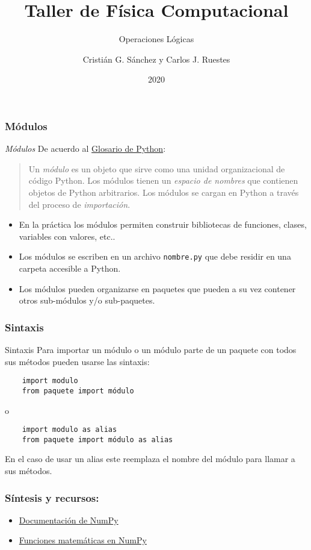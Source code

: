 \documentclass{beamer}
\title{Taller de Física Computacional}
\subtitle{Operaciones Lógicas}
\author{Cristián G. Sánchez y Carlos J. Ruestes}
\date{2020}
\begin{document}
\frame{\titlepage}

\begin{frame}[fragile]
    \frametitle{Módulos}
    \begin{block}{{\em Módulos}}
    De acuerdo al \href{https://docs.python.org/3/glossary.html}{Glosario de Python}:
    \begin{quote}
    Un {\em módulo} es un objeto que sirve como una unidad organizacional de código Python. Los módulos tienen un {\em espacio de nombres} que contienen objetos de Python arbitrarios. Los módulos se cargan en Python a través del proceso de {\em importación}.
    \end{quote}
    \end{block}
    \begin{itemize}
    \item En la práctica los módulos permiten construir bibliotecas de funciones, clases, variables con valores, etc..
    \item Los módulos se escriben en un archivo {\tt nombre.py} que debe residir en una carpeta accesible a Python.
    \item Los módulos pueden organizarse en paquetes que pueden a su vez contener otros sub-módulos y/o sub-paquetes.
    \end{itemize}
    
    \end{frame}

\begin{frame}[fragile]
    \frametitle{Sintaxis}
    \begin{block}{Sintaxis}
    Para importar un módulo o un módulo parte de un paquete con todos sus métodos pueden usarse las sintaxis:
    \begin{verbatim}
    import modulo 
    from paquete import módulo
    \end{verbatim}
    o
    \begin{verbatim}
    import modulo as alias
    from paquete import módulo as alias
    \end{verbatim}
    En el caso de usar un alias este reemplaza el nombre del módulo para llamar a sus métodos.
    \end{block}
    \end{frame}

\begin{frame}
\frametitle{Síntesis y recursos:}

\begin{itemize}
\item \href{https://numpy.org/doc/stable/}{Documentación de NumPy}
\item \href{https://numpy.org/doc/stable/reference/routines.math.html}{Funciones matemáticas en NumPy}

\end{itemize}
\end{frame}
\end{document}
